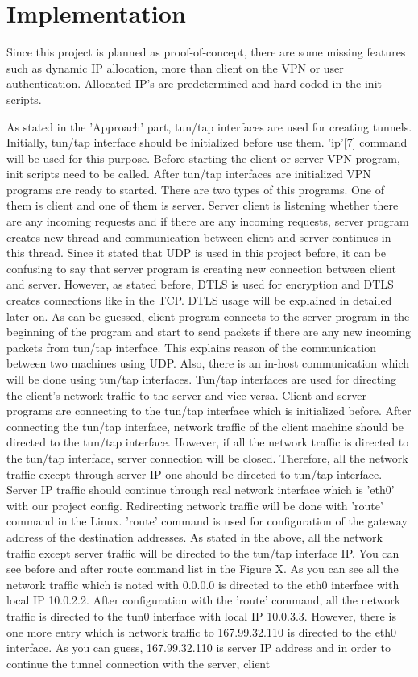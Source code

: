 \documentclass[letterpaper, 10 pt, conference]{ieeeconf}  %
\begin{document}
\section{Implementation}

Since this project is planned as proof-of-concept, there are some missing features such as dynamic IP allocation, more than client on the VPN or user authentication. Allocated IP's are predetermined and hard-coded in the init scripts.  

As stated in the 'Approach' part, tun/tap interfaces are used for creating tunnels. Initially, tun/tap interface should be initialized before use them. 'ip'[7] command will be used for this purpose. Before starting the client or server VPN program, init scripts need to be called. After tun/tap interfaces are initialized VPN programs are ready to started. There are two types of this programs. One of them is client and one of them is server. Server client is listening whether there are any incoming requests and if there are any incoming requests, server program creates new thread and communication between client and server continues in this thread. Since it stated that UDP is used in this project before, it can be confusing to say that server program is creating new connection between client and server. However, as stated before, DTLS is used for encryption and DTLS creates connections like in the TCP. DTLS usage will be explained in detailed later on. As can be guessed, client program connects to the server program in the beginning of the program and start to send packets if there are any new incoming packets from tun/tap interface. This explains reason of the communication between two machines using UDP. Also, there is an in-host communication which will be done using tun/tap interfaces. Tun/tap interfaces are used for directing the client's network traffic to the server and vice versa. Client and server programs are connecting to the tun/tap interface which is initialized before. After connecting the tun/tap interface, network traffic of the client machine should be directed to the tun/tap interface. However, if all the network traffic is directed to the tun/tap interface, server connection will be closed. Therefore, all the network traffic except through server IP one should be directed to tun/tap interface. Server IP traffic should continue through real network interface which is 'eth0' with our project config.
Redirecting network traffic will be done with 'route' command in the Linux. 'route' command is used for configuration of the gateway address of the destination addresses. As stated in the above, all the network traffic except server traffic will be directed to the tun/tap interface IP. You can see before and after route command list in the Figure X. As you can see all the network traffic which is noted with 0.0.0.0 is directed to the eth0 interface with local IP 10.0.2.2. After configuration with the 'route' command, all the network traffic is directed to the tun0 interface with  local IP 10.0.3.3. However, there is one more entry which is network traffic to 167.99.32.110 is directed to the eth0 interface. As you can guess, 167.99.32.110 is server IP address and in order to continue the tunnel connection with the server, client 
\end{document}
